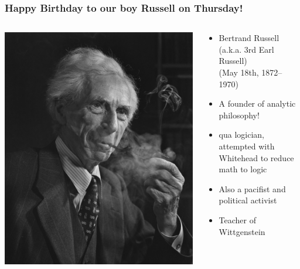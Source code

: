 \begin{frame}
  \frametitle{Happy Birthday to our boy Russell on Thursday!}

  \begin{columns}
    \begin{column}{.5\textwidth}
      \includegraphics[height=.8\textheight]{../assets/russell_pipe}
    \end{column}
    \begin{column}{.6\textwidth}
      \begin{itemize}[<+->]
        \item Bertrand Russell \\ (a.k.a. 3rd Earl Russell) \\ (May 18th, 1872--1970)
\item A founder of analytic philosophy!

\item qua logician, attempted with Whitehead to reduce math to logic 

\item Also a pacifist and political activist 

\item Teacher of Wittgenstein
      \end{itemize}
    \end{column}
  \end{columns}
\end{frame}

